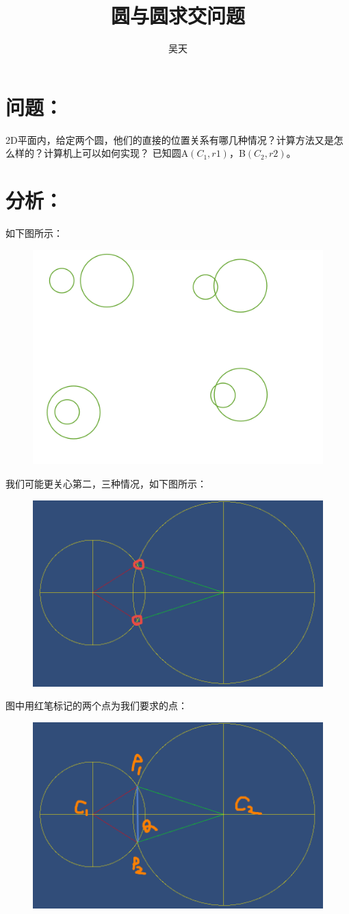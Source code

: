 \documentclass[UTF8,12pt]{article}
\title{圆与圆求交问题}
\author{吴天}
\begin{document}
	\maketitle
	
	\section{问题：}
	2D平面内，给定两个圆，他们的直接的位置关系有哪几种情况？计算方法又是怎么样的？计算机上可以如何实现？
	已知圆A$(C_1,r1)$，B$(C_2,r2)$。
	\section{分析：}
	如下图所示：
	\begin{figure}
		\centering
		\includegraphics[width=0.4\linewidth]{pic0}
		\caption{}
		\label{fig:pic0}
	\end{figure}
	我们可能更关心第二，三种情况，如下图所示：
	\begin{figure}
		\centering
		\includegraphics[width=0.7\linewidth]{pic1}
		\caption{}
		\label{fig:pic1}
	\end{figure}
	图中用红笔标记的两个点为我们要求的点：
	\begin{figure}
		\centering
		\includegraphics[width=0.7\linewidth]{pic2}
		\caption{}
		\label{fig:pic2}
	\end{figure}
\end{document}
